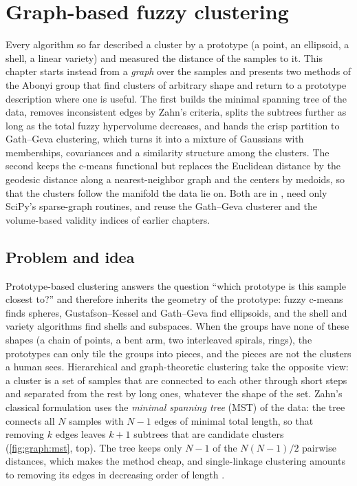 \chapter{Graph-based fuzzy clustering}\label{ch:graph}
\begin{roadmap}
Every algorithm so far described a cluster by a prototype (a point, an ellipsoid, a shell, a linear variety) and measured the distance of the samples to it. This chapter starts instead from a \emph{graph} over the samples and presents two methods of the Abonyi group that find clusters of arbitrary shape and return to a prototype description where one is useful. The first builds the minimal spanning tree of the data, removes inconsistent edges by Zahn's criteria, splits the subtrees further as long as the total fuzzy hypervolume decreases, and hands the crisp partition to Gath--Geva clustering, which turns it into a mixture of Gaussians with memberships, covariances and a similarity structure among the clusters. The second keeps the c-means functional but replaces the Euclidean distance by the geodesic distance along a nearest-neighbor graph and the centers by medoids, so that the clusters follow the manifold the data lie on. Both are in , need only SciPy's sparse-graph routines, and reuse the Gath--Geva clusterer and the volume-based validity indices of earlier chapters.
\end{roadmap}

\section{Problem and idea}\label{sec:graph:problem}

Prototype-based clustering answers the question ``which prototype is this sample closest to?'' and therefore inherits the geometry of the prototype: fuzzy c-means finds spheres, Gustafson--Kessel and Gath--Geva find ellipsoids, and the shell and variety algorithms find shells and subspaces. When the groups have none of these shapes (a chain of points, a bent arm, two interleaved spirals, rings), the prototypes can only tile the groups into pieces, and the pieces are not the clusters a human sees. Hierarchical and graph-theoretic clustering take the opposite view: a cluster is a set of samples that are connected to each other through short steps and separated from the rest by long ones, whatever the shape of the set. Zahn's classical formulation \cite{zahn:1971} uses the \emph{minimal spanning tree} (MST) of the data: the tree connects all $N$ samples with $N-1$ edges of minimal total length, so that removing $k$ edges leaves $k+1$ subtrees that are candidate clusters (\cref{fig:graph:mst}, top). The tree keeps only $N-1$ of the $N(N-1)/2$ pairwise distances, which makes the method cheap, and single-linkage clustering amounts to removing its edges in decreasing order of length \cite{gower:1969:mst}.

